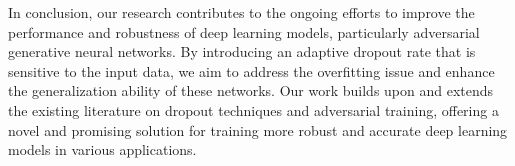 In conclusion, our research contributes to the ongoing efforts to improve the performance and robustness of deep learning models, particularly adversarial generative neural networks. By introducing an adaptive dropout rate that is sensitive to the input data, we aim to address the overfitting issue and enhance the generalization ability of these networks. Our work builds upon and extends the existing literature on dropout techniques and adversarial training, offering a novel and promising solution for training more robust and accurate deep learning models in various applications.